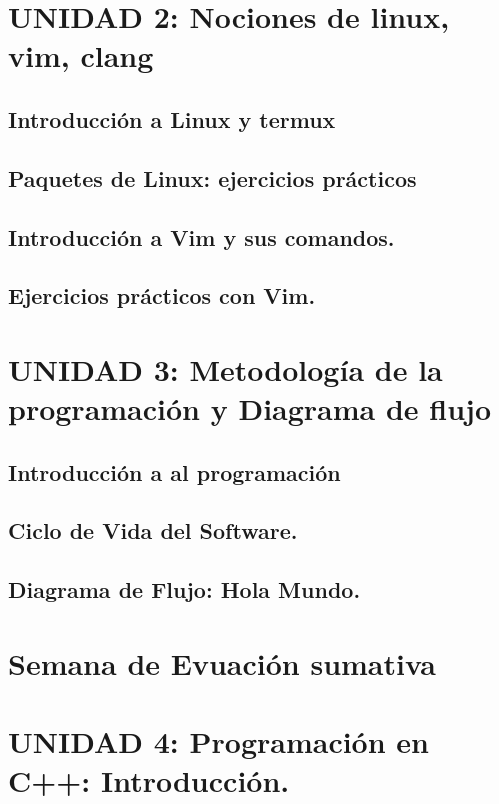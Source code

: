 \documentclass[presentation, aspectratio=54]{beamer}
\begin{document}
\section{UNIDAD 2: Nociones de linux, vim, clang}
\label{sec:org51dc46a}
\subsection{Introducción a Linux y termux}
\label{sec:orgdca767f}
\subsection{Paquetes de Linux: ejercicios prácticos}
\label{sec:org2b691df}
\subsection{Introducción a Vim  y sus comandos.}
\label{sec:orgda9af11}
\subsection{Ejercicios prácticos con Vim.}
\label{sec:org56ff554}
\section{UNIDAD 3: Metodología de la programación y Diagrama de flujo}
\label{sec:org8754209}
\subsection{Introducción a al programación}
\label{sec:org9cbb1de}
\subsection{Ciclo de Vida del Software.}
\label{sec:org43e03b6}
\subsection{Diagrama de Flujo: Hola Mundo.}
\label{sec:org5a8d09f}
\section{Semana de Evuación sumativa}
\label{sec:org2a0fd8b}
\section{UNIDAD 4: Programación en C++: Introducción.}
\label{sec:org302b622}
\end{document}
